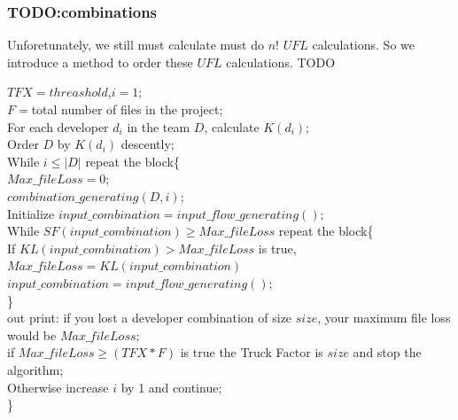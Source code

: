 \documentclass[11pt, a4paper, openright]{report}
\begin{document}
\subsubsection{TODO:combinations}
Unforetunately, we still must calculate must do $n!$ $UFL$ calculations. So we introduce a method to order these $UFL$ calculations.
TODO
\begin{algorithm}
	\SetAlgoLined
\end{algorithm}
\begin{raggedright}
	\scriptsize
	$TFX = threashold$,$i=1$;\\
	$F=$total number of files in the project;\\
	For each developer $d_i$ in the team $D$, calculate $K(d_i)$;\\
	Order $D$ by $K(d_i)$ descently;\\
	While $i\leq |D|$ repeat the block\{\\
	$Max\_fileLoss =0$;\\
	$combination\_generating(D,i)$;\\
	Initialize $input\_combination = input\_flow\_generating()$;\\
	While $SF(input\_combination)\geq Max\_fileLoss$ repeat the block\{\\
	If $KL(input\_combination) > Max\_fileLoss$ is true, $Max\_fileLoss=KL(input\_combination)$
	$input\_combination = input\_flow\_generating()$;\\
	\}\\
	out print: if you lost a developer combination of size $size$, your maximum file loss would be $Max\_fileLoss$;\\
	if $Max\_fileLoss \geq (TFX*F)$ is true the Truck Factor is $size$ and stop the algorithm;\\
	Otherwise increase $i$ by 1 and continue;\\
	\}\\
\end{raggedright}
\end{document}
